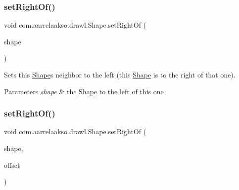 \subsubsection{\texorpdfstring{set\+Right\+Of()}{setRightOf()}\hspace{0.1cm}{\footnotesize\ttfamily [1/2]}}
{\footnotesize\ttfamily void com.\+aarrelaakso.\+drawl.\+Shape.\+set\+Right\+Of (\begin{DoxyParamCaption}\item[{@Not\+Null final \hyperlink{classcom_1_1aarrelaakso_1_1drawl_1_1_shape}{Shape}}]{shape }\end{DoxyParamCaption})\hspace{0.3cm}{\ttfamily [inherited]}}



Sets this \hyperlink{classcom_1_1aarrelaakso_1_1drawl_1_1_shape}{Shape}\textquotesingle{}s neighbor to the left (this \hyperlink{classcom_1_1aarrelaakso_1_1drawl_1_1_shape}{Shape} is to the right of that one). 


\begin{DoxyParams}{Parameters}
{\em shape} & the \hyperlink{classcom_1_1aarrelaakso_1_1drawl_1_1_shape}{Shape} to the left of this one \\
\hline
\end{DoxyParams}
\mbox{\label{classcom_1_1aarrelaakso_1_1drawl_1_1_shape_a89e85848d24dca0fa60ff68d169eef11}} 
\subsubsection{\texorpdfstring{set\+Right\+Of()}{setRightOf()}\hspace{0.1cm}{\footnotesize\ttfamily [2/2]}}
{\footnotesize\ttfamily void com.\+aarrelaakso.\+drawl.\+Shape.\+set\+Right\+Of (\begin{DoxyParamCaption}\item[{@Not\+Null final \hyperlink{classcom_1_1aarrelaakso_1_1drawl_1_1_shape}{Shape}}]{shape,  }\item[{@Not\+Null final \hyperlink{classcom_1_1aarrelaakso_1_1drawl_1_1_measure}{Measure}}]{offset }\end{DoxyParamCaption})\hspace{0.3cm}{\ttfamily [inherited]}}




